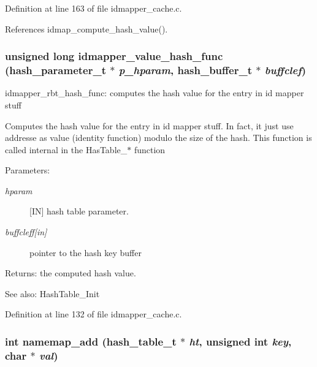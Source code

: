 Definition at line 163 of file idmapper\_\-cache.c.

References idmap\_\-compute\_\-hash\_\-value().
\subsubsection{\setlength{\rightskip}{0pt plus 5cm}unsigned long idmapper\_\-value\_\-hash\_\-func (hash\_\-parameter\_\-t $\ast$ {\em p\_\-hparam}, hash\_\-buffer\_\-t $\ast$ {\em buffclef})}\label{idmapper__cache_8c_a6}


idmapper\_\-rbt\_\-hash\_\-func: computes the hash value for the entry in id mapper stuff

Computes the hash value for the entry in id mapper stuff. In fact, it just use addresse as value (identity function) modulo the size of the hash. This function is called internal in the Has\-Table\_\-$\ast$ function

\begin{Desc}
\item[Parameters:]
\begin{description}
\item[{\em hparam}][IN] hash table parameter. \item[{\em buffcleff\mbox{[}in\mbox{]}}]pointer to the hash key buffer\end{description}
\end{Desc}
\begin{Desc}
\item[Returns:]the computed hash value.\end{Desc}
\begin{Desc}
\item[See also:]Hash\-Table\_\-Init \end{Desc}


Definition at line 132 of file idmapper\_\-cache.c.
\subsubsection{\setlength{\rightskip}{0pt plus 5cm}int namemap\_\-add (hash\_\-table\_\-t $\ast$ {\em ht}, unsigned int {\em key}, char $\ast$ {\em val})}\label{idmapper__cache_8c_a20}




